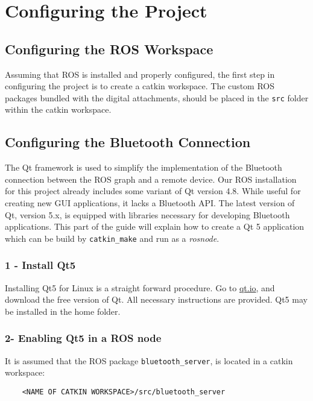 \section{Configuring the Project}

\subsection{Configuring the ROS Workspace}

Assuming that ROS is installed and properly configured, the first step in configuring the project is to create a catkin workspace. The custom ROS packages bundled with the digital attachments, should be placed in the \texttt{src} folder within the catkin workspace.

\subsection{Configuring the Bluetooth Connection}

The Qt framework is used to simplify the implementation of the Bluetooth connection between the \ac{ROS} graph and a remote device. Our \ac{ROS} installation for this project already includes some variant of Qt version 4.8. While useful for creating new \ac{GUI} applications, it lacks a Bluetooth API. The latest version of Qt, version 5.x, is equipped with libraries necessary for developing Bluetooth applications. This part of the guide will explain how to create a Qt 5 application which can be build by \texttt{catkin\_make} and run as a \textit{rosnode}.

\subsubsection{1 - Install Qt5}

Installing Qt5 for Linux is a straight forward procedure. Go to \url{qt.io}, and download the free version of Qt. All necessary instructions are provided. Qt5 may be installed in the home folder.

\subsubsection{2- Enabling Qt5 in a ROS node}

It is assumed that the \ac{ROS} package \texttt{bluetooth\_server}, is located in a catkin workspace:
\begin{verbatim}
	<NAME OF CATKIN WORKSPACE>/src/bluetooth_server
\end{verbatim}


